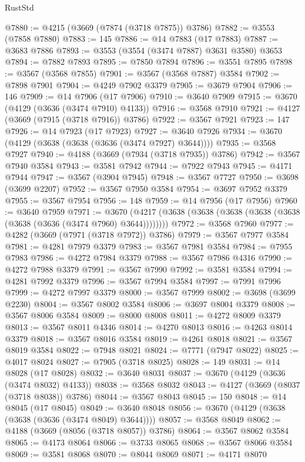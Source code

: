 \begin{lexlean}{RustStd}
\begin{coremodule}
@7880 := @4215 (@3669 (@7874 (@3718 @7875)) @3786)
@7882 := @3553 (@7858 @7880)
@7883 := 145
@7886 := @14 @7883 (@17 @7883)
@7887 := @3683 @7886
@7893 := @3553 (@3554 (@3474 @7887) @3631 @3580) @3653
@7894 := @7882 @7893
@7895 := @7850 @7894
@7896 := @3551 @7895
@7898 := @3567 (@3568 @7855)
@7901 := @3567 (@3568 @7887) @3584
@7902 := @7898 @7901
@7904 := @4249 @7902 @3379
@7905 := @3679 @7904
@7906 := 146
@7909 := @14 @7906 (@17 @7906)
@7910 := @3640 @7909
@7915 := @3670 (@4129 (@3636 (@3474 @7910) @4133))
@7916 := @3568 @7910
@7921 := @4127 (@3669 (@7915 (@3718 @7916)) @3786)
@7922 := @3567 @7921
@7923 := 147
@7926 := @14 @7923 (@17 @7923)
@7927 := @3640 @7926
@7934 := @3670 (@4129 (@3638 (@3638 (@3636 (@3474 @7927) @3644))))
@7935 := @3568 @7927
@7940 := @4188 (@3669 (@7934 (@3718 @7935)) @3786)
@7942 := @3567 @7940 @3584
@7943 := @3581 @7942
@7944 := @7922 @7943
@7945 := @4171 @7944
@7947 := @3567 (@3904 @7945)
@7948 := @3567 @7727
@7950 := @3698 (@3699 @2207)
@7952 := @3567 @7950 @3584
@7954 := @3697 @7952 @3379
@7955 := @3567 @7954
@7956 := 148
@7959 := @14 @7956 (@17 @7956)
@7960 := @3640 @7959
@7971 := @3670 (@4217 (@3638 (@3638 (@3638 (@3638 (@3638 (@3638 (@3636 (@3474 @7960) @3644))))))))
@7972 := @3568 @7960
@7977 := @4282 (@3669 (@7971 (@3718 @7972)) @3786)
@7979 := @3567 @7977 @3584
@7981 := @4281 @7979 @3379
@7983 := @3567 @7981 @3584
@7984 := @7955 @7983
@7986 := @4272 @7984 @3379
@7988 := @3567 @7986 @4316
@7990 := @4272 @7988 @3379
@7991 := @3567 @7990
@7992 := @3581 @3584
@7994 := @4281 @7992 @3379
@7996 := @3567 @7994 @3584
@7997 := @7991 @7996
@7999 := @4272 @7997 @3379
@8000 := @3567 @7999
@8002 := @3698 (@3699 @2230)
@8004 := @3567 @8002 @3584
@8006 := @3697 @8004 @3379
@8008 := @3567 @8006 @3584
@8009 := @8000 @8008
@8011 := @4272 @8009 @3379
@8013 := @3567 @8011 @4346
@8014 := @4270 @8013
@8016 := @4263 @8014 @3379
@8018 := @3567 @8016 @3584
@8019 := @4261 @8018
@8021 := @3567 @8019 @3584
@8022 := @7948 @8021
@8024 := @7771 (@7947 @8022)
@8025 := @4017 @8024
@8027 := @7905 (@3718 @8025)
@8028 := 149
@8031 := @14 @8028 (@17 @8028)
@8032 := @3640 @8031
@8037 := @3670 (@4129 (@3636 (@3474 @8032) @4133))
@8038 := @3568 @8032
@8043 := @4127 (@3669 (@8037 (@3718 @8038)) @3786)
@8044 := @3567 @8043
@8045 := 150
@8048 := @14 @8045 (@17 @8045)
@8049 := @3640 @8048
@8056 := @3670 (@4129 (@3638 (@3638 (@3636 (@3474 @8049) @3644))))
@8057 := @3568 @8049
@8062 := @4188 (@3669 (@8056 (@3718 @8057)) @3786)
@8064 := @3567 @8062 @3584
@8065 := @4173 @8064
@8066 := @3733 @8065
@8068 := @3567 @8066 @3584
@8069 := @3581 @8068
@8070 := @8044 @8069
@8071 := @4171 @8070

\end{coremodule}
\end{lexlean}
